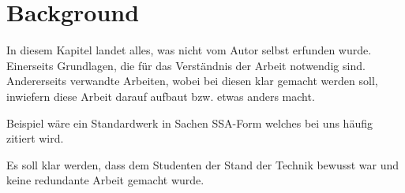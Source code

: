 \chapter{Background}\label{sec:background}

In diesem Kapitel landet alles,
was nicht vom Autor selbst erfunden wurde.
Einerseits Grundlagen,
die für das Verständnis der Arbeit notwendig sind.
Andererseits verwandte Arbeiten,
wobei bei diesen klar gemacht werden soll,
inwiefern diese Arbeit darauf aufbaut bzw. etwas anders macht.

Beispiel wäre ein Standardwerk in Sachen SSA-Form
welches bei uns häufig zitiert wird.

Es soll klar werden,
dass dem Studenten der Stand der Technik bewusst war
und keine redundante Arbeit gemacht wurde.
